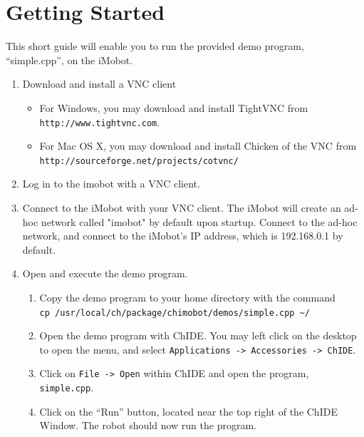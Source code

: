 \documentclass[11pt]{report}
\begin{document}
\chapter{Getting Started}
This short guide will enable you to run the provided demo program,
``simple.cpp'', on the iMobot.
\begin{enumerate}
\item Download and install a VNC client
  \begin{itemize}
  \item For Windows, you may download and install TightVNC from \texttt{http://www.tightvnc.com}.
  \item For Mac OS X, you may download and install Chicken of the VNC from\\
  \texttt{http://sourceforge.net/projects/cotvnc/}
  \end{itemize}
\item Log in to the imobot with a VNC client. 
\item Connect to the iMobot with your VNC client. The iMobot will create an ad-hoc network
called "imobot" by default upon startup. Connect to the ad-hoc network, and connect
to the iMobot's IP address, which is 192.168.0.1 by default.
\item Open and execute the demo program.
  \begin{enumerate}
  \item Copy the demo program to your home directory with the command\\
  \texttt{cp /usr/local/ch/package/chimobot/demos/simple.cpp \textasciitilde/}
  \item Open the demo program with ChIDE. You may left click on the desktop to open the menu, and select \texttt{Applications -> Accessories -> ChIDE}.
  \item Click on \texttt{File -> Open} within ChIDE and open the program, \texttt{simple.cpp}. 
  \item Click on the ``Run'' button, located near the top right of the ChIDE Window. The robot should now run the program.
  \end{enumerate}
\end{enumerate}
\end{document}
